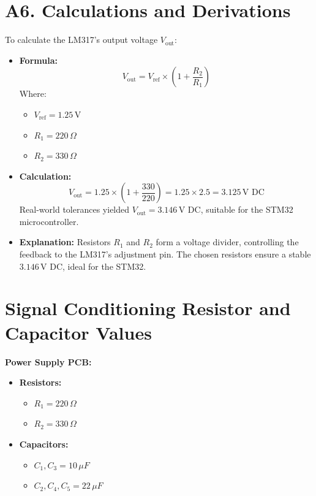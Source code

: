 \documentclass[12pt]{article}
\begin{document}
\section*{A6. Calculations and Derivations}
To calculate the LM317's output voltage \( V_{\text{out}} \):
\begin{itemize}
  \item \textbf{Formula:}
    \[
      V_{\text{out}} = V_{\text{ref}} \times \left( 1 + \frac{R_2}{R_1} \right)
    \]
    Where:
    \begin{itemize}
      \item \( V_{\text{ref}} = 1.25 \, \text{V} \)
      \item \( R_1 = 220 \, \Omega \)
      \item \( R_2 = 330 \, \Omega \)
    \end{itemize}
  \item \textbf{Calculation:}
    \[
      V_{\text{out}} = 1.25 \times \left( 1 + \frac{330}{220} \right) = 1.25 \times 2.5 = 3.125 \, \text{V DC}
    \]
    Real-world tolerances yielded \( V_{\text{out}} = 3.146 \, \text{V DC} \), suitable for the STM32 microcontroller.

  \item \textbf{Explanation:}
    Resistors \( R_1 \) and \( R_2 \) form a voltage divider, controlling the feedback to the LM317’s adjustment pin. The chosen resistors ensure a stable \( 3.146 \, \text{V DC} \), ideal for the STM32.
\end{itemize}
    \section*{Signal Conditioning Resistor and Capacitor Values}
\textbf{Power Supply PCB:}
\begin{itemize}
    \item \textbf{Resistors:}
    \begin{itemize}
        \item \( R_1 = 220 \, \Omega \)
        \item \( R_2 = 330 \, \Omega \)
    \end{itemize}
    \item \textbf{Capacitors:}
    \begin{itemize}
        \item \( C_1, C_3 = 10 \, \mu F \)
        \item \( C_2, C_4, C_5 = 22 \, \mu F \)
    \end{itemize}
\end{itemize}
\end{document}
